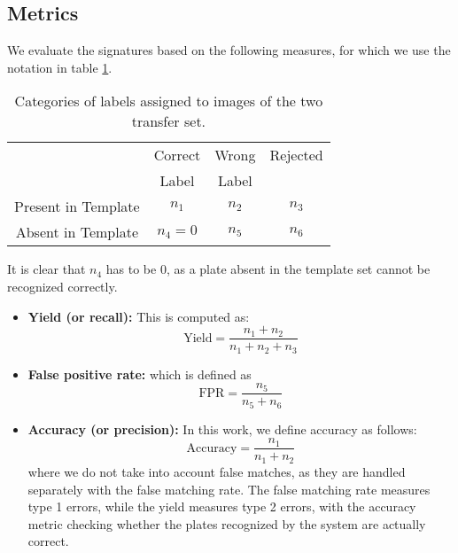 \documentclass[10pt,twocolumn,letterpaper]{article}
\begin{document}
    \subsection{Metrics \label{sec:expt:metrics}}
        We evaluate the signatures based on the following measures, for which we use the notation in table \ref{tab:metrics}.
        
        \begin{table}[!h]
        \caption{Categories of labels assigned to images of the two transfer set.}\label{tab:metrics}
        \begin{center}
        \begin{tabular}{|c|c|c|c|}
        \hline
        ~ & Correct & Wrong & Rejected \\
        ~ & Label & Label & ~ \\
        \hline
        Present in Template & $n_1$ & $n_2$ & $n_3$\\
        Absent in Template  & $n_4=0$ & $n_5$ & $n_6$\\
        \hline
        \end{tabular}
        \end{center}
        \end{table}
 It is clear that $n_4$ has to be $0$, as a plate absent in the template set cannot be recognized correctly.
        
        \begin{itemize}
            \item \textbf{Yield (or recall):} This is computed as:
                \begin{equation}
                    \text{Yield} = \frac{n_1 + n_2}{n_1 + n_2 + n_3}
                \end{equation}
            \item \textbf{False positive rate:} which is defined as
                \begin{equation}
                    \text{FPR} = \frac{n_5}{n_5 + n_6}
                \end{equation}
            \item \textbf{Accuracy (or precision):} In this work, we define accuracy as follows:
                \begin{equation}
                    \text{Accuracy} = \frac{n_1}{n_1 + n_2}
                \end{equation}
                where we do not take into account false matches, as they are handled separately with the false matching rate. The false matching rate measures type 1 errors, while the yield measures type 2 errors, with the accuracy metric checking whether the plates recognized by the system are actually correct.
        \end{itemize}    
\end{document}
